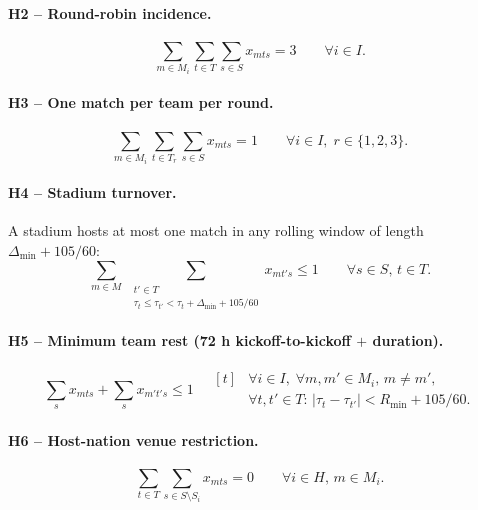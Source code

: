 \documentclass[12pt, letterpaper]{article}
\begin{document}
\paragraph{H2 -- Round-robin incidence.}
\begin{equation}
\sum_{m\in M_i}\sum_{t\in T}\sum_{s\in S} x_{mts}=3 \qquad\forall i\in I.
\end{equation}

\paragraph{H3 -- One match per team per round.}
\begin{equation}
\sum_{m\in M_i}\sum_{t\in T_r}\sum_{s\in S} x_{mts}=1
  \qquad\forall i\in I,\;r\in\{1,2,3\}.
\end{equation}

\paragraph{H4 -- Stadium turnover.} A stadium hosts at most one match in
any rolling window of length $\Delta_{\min}+105/60$:
\begin{equation}
\sum_{m\in M}\;\sum_{\substack{t'\in T\\ \tau_t\le\tau_{t'}<\tau_t+\Delta_{\min}+105/60}}
  x_{mt's}\le 1 \qquad\forall s\in S,\,t\in T.
\end{equation}

\paragraph{H5 -- Minimum team rest (72 h kickoff-to-kickoff $+$ duration).}
\begin{equation}
\sum_{s} x_{mts}+\sum_{s} x_{m't's}\le 1
  \quad
  \begin{aligned}[t]
  &\forall i\in I,\;\forall m,m'\in M_i,\,m\neq m',\\
  &\forall t,t'\in T:\,|\tau_t-\tau_{t'}|<R_{\min}+105/60.
  \end{aligned}
\end{equation}

\paragraph{H6 -- Host-nation venue restriction.}
\begin{equation}
\sum_{t\in T}\sum_{s\in S\setminus S_i} x_{mts}=0
  \qquad\forall i\in H,\,m\in M_i.
\end{equation}
\end{document}
